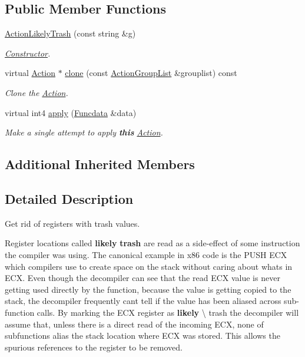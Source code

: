 \subsection*{Public Member Functions}
\begin{DoxyCompactItemize}
\item 
\mbox{\hyperlink{class_action_likely_trash_a49eaf6fd21182ad4387a8c70e86c46c2}{Action\+Likely\+Trash}} (const string \&g)
\begin{DoxyCompactList}\small\item\em \mbox{\hyperlink{class_constructor}{Constructor}}. \end{DoxyCompactList}\item 
virtual \mbox{\hyperlink{class_action}{Action}} $\ast$ \mbox{\hyperlink{class_action_likely_trash_ad0d1990ca8b2b48d5d88d757b3664560}{clone}} (const \mbox{\hyperlink{class_action_group_list}{Action\+Group\+List}} \&grouplist) const
\begin{DoxyCompactList}\small\item\em Clone the \mbox{\hyperlink{class_action}{Action}}. \end{DoxyCompactList}\item 
virtual int4 \mbox{\hyperlink{class_action_likely_trash_afbd2ec1783db1f08cedf5b259304f158}{apply}} (\mbox{\hyperlink{class_funcdata}{Funcdata}} \&data)
\begin{DoxyCompactList}\small\item\em Make a single attempt to apply {\bfseries{this}} \mbox{\hyperlink{class_action}{Action}}. \end{DoxyCompactList}\end{DoxyCompactItemize}
\subsection*{Additional Inherited Members}


\subsection{Detailed Description}
Get rid of registers with trash values. 

Register locations called {\bfseries{likely}} {\bfseries{trash}} are read as a side-\/effect of some instruction the compiler was using. The canonical example in x86 code is the P\+U\+SH E\+CX which compilers use to create space on the stack without caring about what\textquotesingle{}s in E\+CX. Even though the decompiler can see that the read E\+CX value is never getting used directly by the function, because the value is getting copied to the stack, the decompiler frequently can\textquotesingle{}t tell if the value has been aliased across sub-\/function calls. By marking the E\+CX register as {\bfseries{likely}} \textbackslash{} trash the decompiler will assume that, unless there is a direct read of the incoming E\+CX, none of subfunctions alias the stack location where E\+CX was stored. This allows the spurious references to the register to be removed. 


